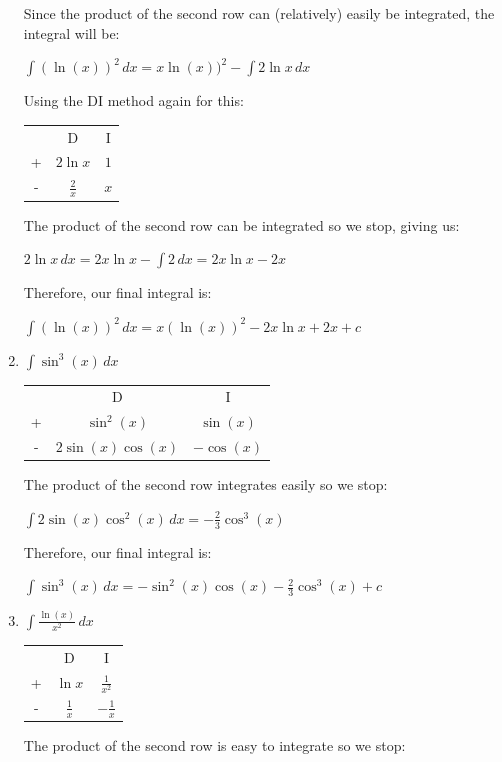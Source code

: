 \documentclass[../main.tex]{subfiles}
\begin{document}
\begin{enumerate}
    Since the product of the second row can (relatively) easily be integrated, the integral will be:

    \(\int (\ln{(x)})^2\, dx=x\ln{(x)})^2-\int 2\ln{x}\, dx\)

    Using the DI method again for this:

    \begin{tabular}{ c c c }
       & D & I \\ 
     +  & $2\ln{x}$ &$1$ \\  
     - & $\frac{2}{x}$ & $x$\\ 
    \end{tabular}

    The product of the second row can be integrated so we stop, giving us:

    \(2\ln{x}\, dx=2x\ln{x}-\int 2\,dx=2x\ln{x}-2x\)

    Therefore, our final integral is:

    \(\int (\ln{(x)})^2\, dx=x(\ln{(x)})^2-2x\ln{x}+2x+c\)

    \item \(\int \sin^3{(x)}\,dx\)
    
    \begin{tabular}{ c c c }
       & D & I \\ 
     +  & $\sin^2{(x)}$ &$\sin{(x)}$ \\  
     - & $2\sin{(x)}\cos{(x)}$ & $-\cos{(x)}$\\ 
    \end{tabular}

    The product of the second row integrates easily so we stop:

    \(\int 2\sin{(x)}\cos^2{(x)}\, dx=-\frac{2}{3}\cos^3{(x)}\)

    Therefore, our final integral is:

    \(\int \sin^3{(x)}\,dx=-\sin^2{(x)}\cos{(x)}-\frac{2}{3}\cos^3{(x)}+c\)

    \item \(\int \frac{\ln{(x)}}{x^2}\, dx\)
    
    \begin{tabular}{ c c c }
       & D & I \\ 
     +  & $\ln{x}$     &$\frac{1}{x^2}$ \\  
     - & $\frac{1}{x}$   & $-\frac{1}{x}$\\ 
    \end{tabular}

    The product of the second row is easy to integrate so we stop:


\end{enumerate}
\end{document}
